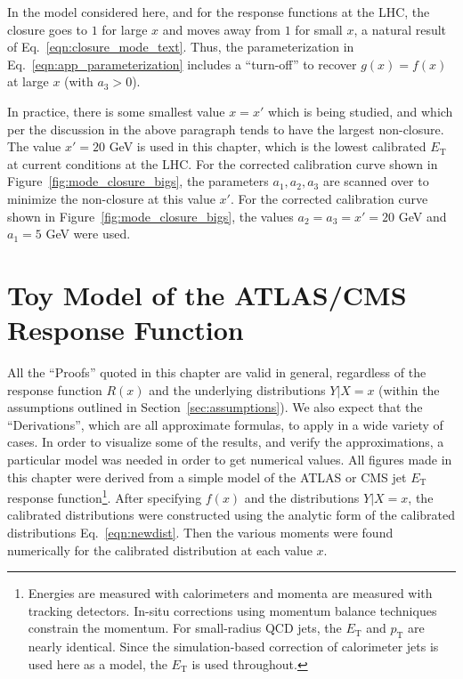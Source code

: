 In the model considered here, and for the response functions at the LHC, the closure goes to $1$ for large $x$ and moves away from $1$ for small $x$, a natural result of Eq.~\ref{eqn:closure_mode_text}. Thus, the parameterization in Eq.~\ref{eqn:app_parameterization} includes a ``turn-off'' to recover $g(x)=f(x)$ at large $x$ (with $a_3>0$).

In practice, there is some smallest value $x=x'$ which is being studied, and which per the discussion in the above paragraph tends to have the largest non-closure. The value $x'=20$ GeV is used in this chapter, which is the lowest calibrated $E_\text{T}$ at current conditions at the LHC. For the corrected calibration curve shown in Figure~\ref{fig:mode_closure_bigs}, the parameters $a_1,a_2,a_3$ are scanned over to minimize the non-closure at this value $x'$. For the corrected calibration curve shown in Figure~\ref{fig:mode_closure_bigs}, the values $a_2=a_3=x'=20$ GeV and $a_1 = 5$ GeV were used.

\clearpage
\newpage
\section{Toy Model of the ATLAS/CMS Response Function}
\label{sec:toy_model}
All the ``Proofs'' quoted in this chapter are valid in general, regardless of the response function $R(x)$ and the underlying distributions $Y|X=x$ (within the assumptions outlined in Section~\ref{sec:assumptions}). We also expect that the ``Derivations'', which are all approximate formulas, to apply in a wide variety of cases. In order to visualize some of the results, and verify the approximations, a particular model was needed in order to get numerical values. All figures made in this chapter were derived from a simple model of the ATLAS or CMS jet $E_\text{T}$ response function\footnote{Energies are measured with calorimeters and momenta are measured with tracking detectors.  In-situ corrections using momentum balance techniques constrain the momentum.  For small-radius QCD jets, the $E_\text{T}$ and $p_\text{T}$ are nearly identical.  Since the simulation-based correction of calorimeter jets is used here as a model, the $E_\text{T}$ is used throughout. }. After specifying $f(x)$ and the distributions $Y|X=x$, the calibrated distributions were constructed using the analytic form of the calibrated distributions Eq.~\ref{eqn:newdist}. Then the various moments were found numerically for the calibrated distribution at each value $x$.

